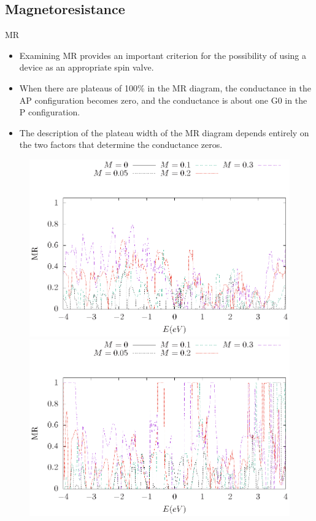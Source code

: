 \documentclass[handout,t]{beamer}
\begin{document}
\subsection{Magnetoresistance}
\begin{frame}{MR}
	\begin{itemize}
		\item Examining MR provides an important criterion for the possibility of using a device as an appropriate spin valve.
		\item When there are plateaus of 100\% in the MR diagram, the conductance in the AP configuration becomes zero, and the conductance is about one G0 in the P configuration.
		\item The description of the plateau width of the MR diagram depends entirely on the two factors that determine the conductance zeros.
	\end{itemize}
	\begin{figure}[ht]
		\centering
		\includegraphics[width=0.45\linewidth]{../figures/MR_zig-revise-thesis.eps}
		\includegraphics[width=0.45\linewidth]{../figures/MR-revise-thesis.eps}
	\end{figure}

\end{frame}
\end{document}
